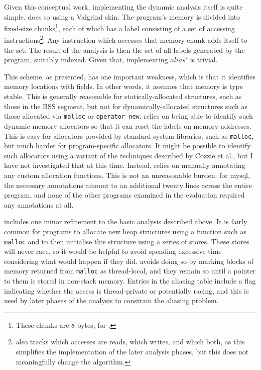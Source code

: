Given this conceptual work, implementing the dynamic analysis itself
is quite simple.  {\Implementation} does so using a Valgrind skin.
The program's memory is divided into fixed-size chunks\footnote{These
  chunks are 8 bytes, for {\implementation}.}, each of which has a
label consisting of a set of accessing
instructions\footnote{{\Implementation} also tracks which accesses are
  reads, which writes, and which both, as this simplifies the
  implementation of the later analysis phases, but this does not
  meaningfully change the algorithm.}.  Any instruction which accesses
that memory chunk adds itself to the set.  The result of the analysis
is then the set of all labels generated by the program, suitably
indexed.  Given that, implementing $\mathit{alias}'$ is trivial.

This scheme, as presented, has one important weakness, which is that
it identifies memory locations with fields.  In other words, it
assumes that memory is type stable\cite{Greenwald1996}.  This is
generally reasonable for statically-allocated structures, such as
those in the BSS segment\cite[Section~7.6]{Stevens}, but not for
dynamically-allocated structures such as those allocated via
\texttt{malloc} or \texttt{operator new}.  {\Implementation} relies on being able to identify
such dynamic memory allocators so that it can reset the labels on
memory addresses.  This is easy for allocators provided by standard
system libraries, such as \texttt{malloc}, but much harder for
program-specific allocators.  It might be possible to identify such
allocators using a variant of the techniques described by Cozzie et
al.\cite{Cozzie2008}, but I have not investigated that at this time.
Instead, {\implementation} relies on manually annotating any custom
allocation functions.  This is not an unreasonable burden: for mysql,
the necessary annotations amount to an additional twenty lines across
the entire program, and none of the other programs examined in the
evaluation required any annotations at all.

{\Implementation} includes one minor refinement to the basic analysis
described above.  It is fairly common for programs to allocate new
heap structures using a function such as \texttt{malloc} and to then
initialise this structure using a series of stores.  These stores will
never race, so it would be helpful to avoid spending excessive time
considering what would happen if they did.  {\Technique} avoids doing
so by marking blocks of memory returned from \texttt{malloc} as
thread-local, and they remain so until a pointer to them is stored in
non-stack memory.  Entries in the aliasing table include a flag
indicating whether the access is thread-private or potentially racing,
and this is used by later phases of the analysis to constrain the
aliasing problem.

